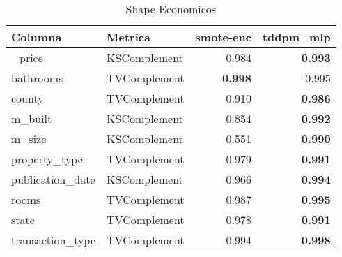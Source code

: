 \begin{table}[H]
\centering
\caption{Shape Economicos}
\label{table-shape-economicos-b-3}
\begin{tabular}{|l|l|r|r|}
\hline
\rowcolor[gray]{0.8}
Columna & Metrica & smote-enc & tddpm\_mlp \\
\hline \_price & KSComplement & 0.984 & \bfseries 0.993 \\
\hline bathrooms & TVComplement & \bfseries 0.998 & 0.995 \\
\hline county & TVComplement & 0.910 & \bfseries 0.986 \\
\hline m\_built & KSComplement & 0.854 & \bfseries 0.992 \\
\hline m\_size & KSComplement & 0.551 & \bfseries 0.990 \\
\hline property\_type & TVComplement & 0.979 & \bfseries 0.991 \\
\hline publication\_date & KSComplement & 0.966 & \bfseries 0.994 \\
\hline rooms & TVComplement & 0.987 & \bfseries 0.995 \\
\hline state & TVComplement & 0.978 & \bfseries 0.991 \\
\hline transaction\_type & TVComplement & 0.994 & \bfseries 0.998 \\
\hline
\end{tabular}
\end{table}
